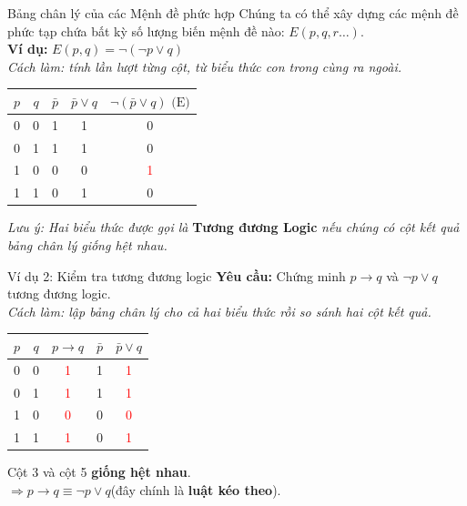 \documentclass[aspectratio=169, 11pt]{beamer}
\begin{document}
\begin{frame}{Bảng chân lý của các Mệnh đề phức hợp}
Chúng ta có thể xây dựng các mệnh đề phức tạp chứa bất kỳ số lượng biến mệnh đề nào: $E(p, q, r\dots)$.\\
\textbf{Ví dụ:} $E(p, q) = \neg(\neg p \lor q)$\\
\textit{Cách làm: tính lần lượt từng cột, từ biểu thức con trong cùng ra ngoài.}

\vspace{0.25cm}
\begin{center}
\begin{tabular}{|c|c|c|c|c|}
\hline
$p$ & $q$ & $\bar{p}$ & $\bar{p} \lor q$ & $\neg(\bar{p} \lor q)\text{ (E)}$ \\
\hline
0 & 0 & 1 & 1 & 0 \\
\hline
0 & 1 & 1 & 1 & 0 \\
\hline
1 & 0 & 0 & 0 & \textcolor{red}{1} \\
\hline
1 & 1 & 0 & 1 & 0 \\
\hline
\end{tabular}
\end{center}

\vspace{0.25cm}
\textit{Lưu ý: Hai biểu thức được gọi là} \textbf{Tương đương Logic} \textit{nếu chúng có cột kết quả bảng chân lý giống hệt nhau.}
\end{frame}

\begin{frame}{Ví dụ 2: Kiểm tra tương đương logic}
\textbf{Yêu cầu:} Chứng minh $p \rightarrow q$ và $\neg p \lor q$ tương đương logic.\\
\textit{Cách làm: lập bảng chân lý cho cả hai biểu thức rồi so sánh hai cột kết quả.}

\vspace{0.25cm}
\begin{center}
\begin{tabular}{|c|c|c|c|c|}
\hline
$p$ & $q$ & $p \rightarrow q$ & $\bar{p}$ & $\bar{p} \lor q$ \\
\hline
0 & 0 & \textcolor{red}{1} & 1 & \textcolor{red}{1} \\
\hline
0 & 1 & \textcolor{red}{1} & 1 & \textcolor{red}{1} \\
\hline
1 & 0 & \textcolor{red}{0} & 0 & \textcolor{red}{0} \\
\hline
1 & 1 & \textcolor{red}{1} & 0 & \textcolor{red}{1} \\
\hline
\end{tabular}
\end{center}

\vspace{0.25cm}
Cột 3 và cột 5 \textbf{giống hệt nhau}.\\
$\Rightarrow p \rightarrow q \equiv \neg p \lor q$\quad (đây chính là \textbf{luật kéo theo}).
\end{frame}
\end{document}
